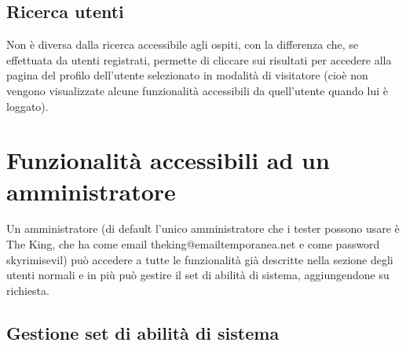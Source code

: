 \documentclass[a4paper,12pt]{article}
\begin{document}
\subsection{Ricerca utenti}
Non è diversa dalla ricerca accessibile agli ospiti, con la differenza che, se effettuata da utenti registrati, permette di cliccare sui risultati per accedere alla pagina del profilo
dell'utente selezionato in modalità di visitatore (cioè non vengono visualizzate alcune funzionalità accessibili da quell'utente quando lui è loggato).

\section{Funzionalità accessibili ad un amministratore}

Un amministratore (di default l'unico amministratore che i tester possono usare è The King, che ha come email theking@emailtemporanea.net e come password skyrimisevil) può accedere a
tutte le funzionalità già descritte nella sezione degli utenti normali e in più può gestire il set di abilità di sistema, aggiungendone su richiesta.

\subsection{Gestione set di abilità di sistema}
\end{document}
